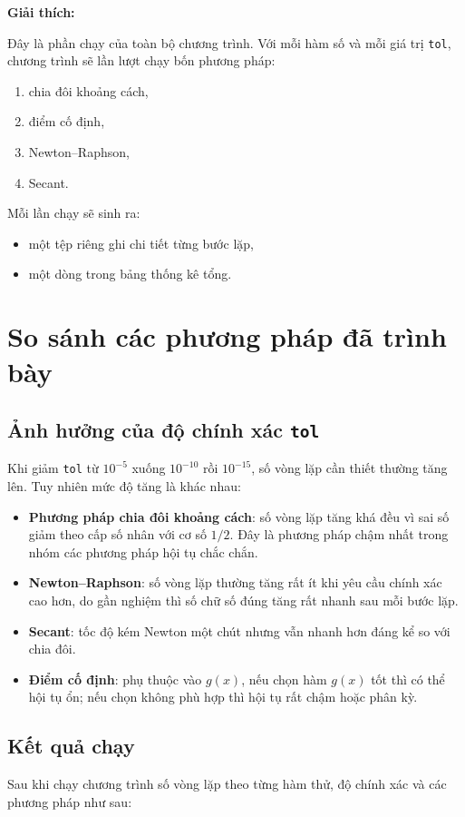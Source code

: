 \documentclass{article}
\begin{document}
\textbf{Giải thích:}

Đây là phần chạy của toàn bộ chương trình. Với mỗi hàm số và mỗi giá trị \texttt{tol}, chương trình sẽ lần lượt chạy bốn phương pháp:
\begin{enumerate}
    \item chia đôi khoảng cách,
    \item điểm cố định,
    \item Newton--Raphson,
    \item Secant.
\end{enumerate}

Mỗi lần chạy sẽ sinh ra:
\begin{itemize}
    \item một tệp riêng ghi chi tiết từng bước lặp,
    \item một dòng trong bảng thống kê tổng.
\end{itemize}


\section{So sánh các phương pháp đã trình bày}


\subsection{Ảnh hưởng của độ chính xác \texttt{tol}}

Khi giảm \texttt{tol} từ \(10^{-5}\) xuống \(10^{-10}\) rồi \(10^{-15}\), số vòng lặp cần thiết thường tăng lên. Tuy nhiên mức độ tăng là khác nhau:
\begin{itemize}
    \item \textbf{Phương pháp chia đôi khoảng cách}: số vòng lặp tăng khá đều vì sai số giảm theo cấp số nhân với cơ số \(1/2\). Đây là phương pháp chậm nhất trong nhóm các phương pháp hội tụ chắc chắn.
    \item \textbf{Newton--Raphson}: số vòng lặp thường tăng rất ít khi yêu cầu chính xác cao hơn, do gần nghiệm thì số chữ số đúng tăng rất nhanh sau mỗi bước lặp.
    \item \textbf{Secant}: tốc độ kém Newton một chút nhưng vẫn nhanh hơn đáng kể so với chia đôi.
    \item \textbf{Điểm cố định}: phụ thuộc vào \(g(x)\), nếu chọn hàm \(g(x)\) tốt thì có thể hội tụ ổn; nếu chọn không phù hợp thì hội tụ rất chậm hoặc phân kỳ.
\end{itemize}

\newpage
\subsection{Kết quả chạy}
Sau khi chạy chương trình số vòng lặp theo từng hàm thử, độ chính xác và các phương pháp như sau:
\end{document}
